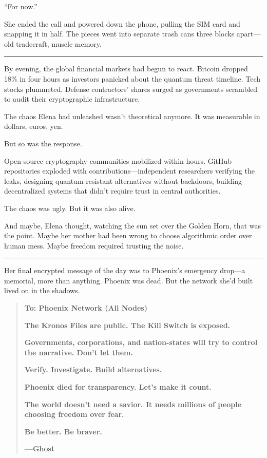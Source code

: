 \documentclass[12pt,letterpaper]{book}
\begin{document}
``For now.''

She ended the call and powered down the phone, pulling the SIM card and snapping it in half. The pieces went into separate trash cans three blocks apart---old tradecraft, muscle memory.

\begin{center}\rule{0.5\linewidth}{0.5pt}\end{center}

By evening, the global financial markets had begun to react. Bitcoin dropped 18\% in four hours as investors panicked about the quantum threat timeline. Tech stocks plummeted. Defense contractors' shares surged as governments scrambled to audit their cryptographic infrastructure.

The chaos Elena had unleashed wasn't theoretical anymore. It was measurable in dollars, euros, yen.

But so was the response.

Open-source cryptography communities mobilized within hours. GitHub repositories exploded with contributions---independent researchers verifying the leaks, designing quantum-resistant alternatives without backdoors, building decentralized systems that didn't require trust in central authorities.

The chaos was ugly. But it was also alive.

And maybe, Elena thought, watching the sun set over the Golden Horn, that was the point. Maybe her mother had been wrong to choose algorithmic order over human mess. Maybe freedom required trusting the noise.

\begin{center}\rule{0.5\linewidth}{0.5pt}\end{center}

Her final encrypted message of the day was to Phoenix's emergency drop---a memorial, more than anything. Phoenix was dead. But the network she'd built lived on in the shadows.

\begin{quote}
\textbf{To: Phoenix Network (All Nodes)}

\textbf{The Kronos Files are public. The Kill Switch is exposed.}

\textbf{Governments, corporations, and nation-states will try to control the narrative. Don't let them.}

\textbf{Verify. Investigate. Build alternatives.}

\textbf{Phoenix died for transparency. Let's make it count.}

\textbf{The world doesn't need a savior. It needs millions of people choosing freedom over fear.}

\textbf{Be better. Be braver.}

\textbf{---Ghost}
\end{quote}
\end{document}

